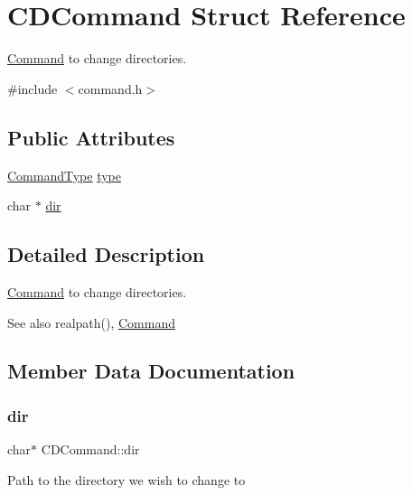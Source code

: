 \hypertarget{structCDCommand}{}\section{C\+D\+Command Struct Reference}
\label{structCDCommand}


\hyperlink{unionCommand}{Command} to change directories.  




{\ttfamily \#include $<$command.\+h$>$}

\subsection*{Public Attributes}
\begin{DoxyCompactItemize}
\item 
\hyperlink{command_8h_a21e038f5b8958e203d28bc4f18472352}{Command\+Type} \hyperlink{structCDCommand_a8e57e7a2c0aa827e7f211cd0b99483f6}{type}
\item 
char $\ast$ \hyperlink{structCDCommand_a3696e9b5a96ed447056a4753906277d1}{dir}
\end{DoxyCompactItemize}


\subsection{Detailed Description}
\hyperlink{unionCommand}{Command} to change directories. 

\begin{DoxySeeAlso}{See also}
realpath(), \hyperlink{unionCommand}{Command} 
\end{DoxySeeAlso}


\subsection{Member Data Documentation}
\mbox{\label{structCDCommand_a3696e9b5a96ed447056a4753906277d1}} 
\subsubsection{\texorpdfstring{dir}{dir}}
{\footnotesize\ttfamily char$\ast$ C\+D\+Command\+::dir}

Path to the directory we wish to change to \mbox{\label{structCDCommand_a8e57e7a2c0aa827e7f211cd0b99483f6}} 

